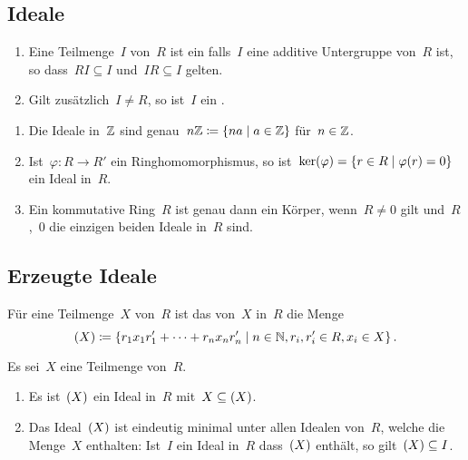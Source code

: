 \subsection{Ideale}

\begin{definition}
  \leavevmode
  \begin{enumerate}
    \item
      Eine Teilmenge~$I$ von~$R$ ist ein  falls~$I$ eine additive Untergruppe von~$R$ ist, so dass~$RI \subseteq I$ und~$IR \subseteq I$ gelten.
    \item
      Gilt zusätzlich~$I \neq R$, so ist~$I$ ein .
  \end{enumerate}
\end{definition}

\begin{example}
  \leavevmode
  \begin{enumerate}
    \item
      Die Ideale in~$\mathbb{Z}$ sind genau~$n \Integer \defined \{ na \suchthat a \in \Integer \}$ für~$n \in \mathbb{Z}$.
    \item
      Ist~$\varphi \colon R \to R'$ ein Ringhomomorphismus, so ist~$\ker(\varphi) = \{ r \in R \suchthat \varphi(r) = 0 \}$ ein Ideal in~$R$.
    \item
      Ein kommutative Ring~$R$ ist genau dann ein Körper, wenn~$R \neq 0$ gilt und~$R$,~$0$ die einzigen beiden Ideale in~$R$ sind.
  \end{enumerate}
\end{example}



\subsection{Erzeugte Ideale}

\begin{definition}
  Für eine Teilmenge~$X$ von~$R$ ist das von~$X$ in~$R$  die Menge
  \[
    \genideal{X}
    \defined
    \{
      r_1 x_1 r'_1 + \dotsb + r_n x_n r'_n
    \suchthat
      n \in \Natural,
      r_i, r'_i \in R,
      x_i \in X
    \} \,.
  \]
\end{definition}

\begin{proposition}
  Es sei~$X$ eine Teilmenge von~$R$.
  \begin{enumerate}
    \item
      Es ist~$(X)$ ein Ideal in~$R$ mit~$X \subseteq (X)$.
    \item
      Das Ideal~$(X)$ ist eindeutig minimal unter allen Idealen von~$R$, welche die Menge~$X$ enthalten:
      Ist~$I$ ein Ideal in~$R$ dass~$(X)$ enthält, so gilt~$(X) \subseteq I$.
  \end{enumerate}
\end{proposition}

